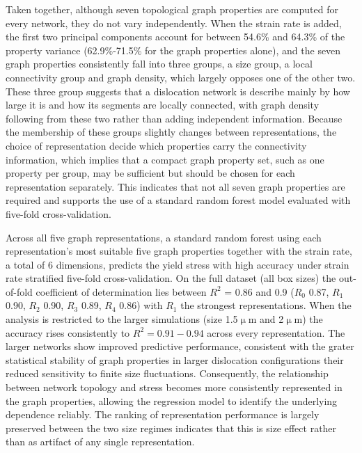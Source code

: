 \documentclass[pdflatex,sn-mathphys-num]{sn-jnl}%
\theoremstyle{thmstyleone}%
\theoremstyle{thmstyletwo}%
\theoremstyle{thmstylethree}%
\begin{document}
Taken together, although seven topological graph properties are computed for every network, they do not vary independently.
When the strain rate is added, the first two principal components account for between 54.6\% and 64.3\% of the property variance (62.9\%-71.5\% for the graph properties alone), and the seven graph properties consistently fall into three groups, a size group, a local connectivity group and graph density, which largely opposes one of the other two. 
These three group suggests that a dislocation network is describe mainly by how large it is and how its segments are locally connected, with graph density following from these two rather than adding independent information.
Because the membership of these groups slightly changes between representations, the choice of representation decide which properties carry the connectivity information, which implies that a compact graph property set, such as one property per group, may be sufficient but should be chosen for each representation separately.
This indicates that not all seven graph properties are required and supports the use of a standard random forest model evaluated with five-fold cross-validation.

Across all five graph representations, a standard random forest using each representation's most suitable five graph properties together with the strain rate, a total of 6 dimensions, predicts the yield stress with high accuracy under strain rate stratified five-fold cross-validation.
On the full dataset (all box sizes) the out-of-fold coefficient of determination lies between $R^2$ = 0.86 and 0.9 ($R_0$ 0.87, $R_1$ 0.90, $R_2$ 0.90, $R_3$ 0.89, $R_4$ 0.86) with $R_1$ the strongest representations.
When the analysis is restricted to the larger simulations (size 1.5$\upmu$m and 2$\upmu$m) the accuracy rises consistently to $R^2 = 0.91-0.94$ across every representation.
The larger networks show improved predictive performance, consistent with the grater statistical stability of graph properties in larger dislocation configurations their reduced sensitivity to finite size fluctuations. Consequently, the relationship between network topology and stress becomes more consistently represented in the graph properties, allowing the regression model to identify the underlying dependence reliably.
The ranking of representation performance is largely preserved between the two size regimes indicates that this is size effect rather than as artifact of any single representation.
\end{document}
